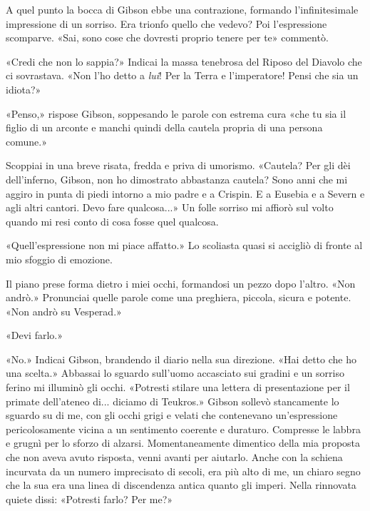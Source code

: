 A quel punto la bocca di Gibson ebbe una contrazione, formando
l'infinitesimale impressione di un sorriso. Era trionfo quello che
vedevo? Poi l'espressione scomparve. «Sai, sono cose che dovresti
proprio tenere per te» commentò.

«Credi che non lo sappia?» Indicai la massa tenebrosa del Riposo del
Diavolo che ci sovrastava. «Non l'ho detto a \emph{lui}! Per la Terra e
l'imperatore! Pensi che sia un idiota?»

«Penso,» rispose Gibson, soppesando le parole con estrema cura «che tu
sia il figlio di un arconte e manchi quindi della cautela propria di una
persona comune.»

Scoppiai in una breve risata, fredda e priva di umorismo. «Cautela? Per
gli dèi dell'inferno, Gibson, non ho dimostrato abbastanza cautela? Sono
anni che mi aggiro in punta di piedi intorno a mio padre e a Crispin. E
a Eusebia e a Severn e agli altri cantori. Devo fare qualcosa...» Un
folle sorriso mi affiorò sul volto quando mi resi conto di cosa fosse
quel qualcosa.

«Quell'espressione non mi piace affatto.» Lo scoliasta quasi si accigliò
di fronte al mio sfoggio di emozione.

Il piano prese forma dietro i miei occhi, formandosi un pezzo dopo
l'altro. «Non andrò.» Pronunciai quelle parole come una preghiera,
piccola, sicura e potente. «Non andrò su Vesperad.»

«Devi farlo.»

«No.» Indicai Gibson, brandendo il diario nella sua direzione. «Hai
detto che ho una scelta.» Abbassai lo sguardo sull'uomo accasciato sui
gradini e un sorriso ferino mi illuminò gli occhi. «Potresti stilare una
lettera di presentazione per il primate dell'ateneo di... diciamo di
Teukros.» Gibson sollevò stancamente lo sguardo su di me, con gli occhi
grigi e velati che contenevano un'espressione pericolosamente vicina a
un sentimento coerente e duraturo. Compresse le labbra e grugnì per lo
sforzo di alzarsi. Momentaneamente dimentico della mia proposta che non
aveva avuto risposta, venni avanti per aiutarlo. Anche con la schiena
incurvata da un numero imprecisato di secoli, era più alto di me, un
chiaro segno che la sua era una linea di discendenza antica quanto gli
imperi. Nella rinnovata quiete dissi: «Potresti farlo? Per me?»

